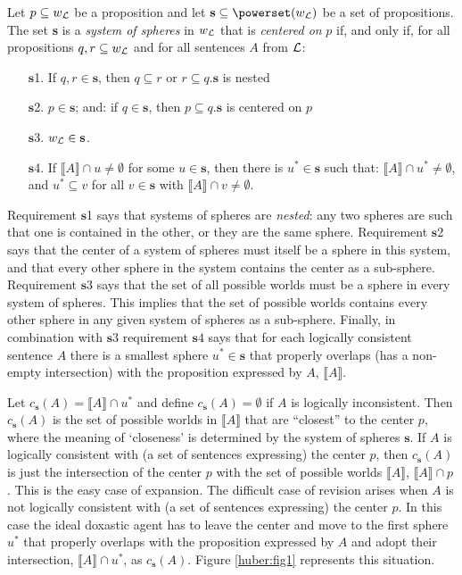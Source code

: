 Let $p\subseteq w_{\cal L}$ be a proposition and let $\textbf{s}\subseteq\powerset\!\left(w_{\cal L}\right)$ be a set of propositions. The set \textbf{s} is a \emph{system of spheres} in $w_{\cal L}$ that is \emph{centered on} $p$ if, and only if, for all propositions $q,r\subseteq w_{\cal L}$ and for all sentences $A$ from $\cal L$:
\begin{enumerate}
\item[$\textbf{s}$1.] If $q,r\in\textbf{s}$, then $q\subseteq r$ or $r\subseteq q$.\hfill $\textbf{s}$ is nested
\item[$\textbf{s}$2.] $p\in\textbf{s}$; and: if $q\in\textbf{s}$, then $p\subseteq q$.\hfill $\textbf{s}$ is centered on $p$
\item[$\textbf{s}$3.] $w_{\cal L}\in\textbf{s}$.
\item[$\textbf{s}$4.] If $\llbracket A\rrbracket\cap u\neq\emptyset$ for some $u\in\textbf{s}$, then there is $u^*\in\textbf{s}$ such that: $\llbracket A\rrbracket\cap u^*\neq\emptyset$, and $u^*\subseteq v$ for all $v\in\textbf{s}$ with $\llbracket A\rrbracket\cap v\neq\emptyset$.
\end{enumerate}
Requirement $\textbf{s}$1 says that systems of spheres are \emph{nested}: any two spheres are such that one is contained in the other, or they are the same sphere. Requirement $\textbf{s}$2
says that the center of a system of spheres must itself be a sphere in this system, and that every other sphere in the system contains the center as a sub-sphere. Requirement $\textbf{s}$3 says that the set of all possible worlds must be a sphere in every system of spheres. This implies that the set of possible worlds contains every other sphere in any given system of spheres as a sub-sphere. Finally, in combination with $\textbf{s}3$ requirement $\textbf{s}4$ says that for each logically consistent sentence $A$ there is a smallest sphere $u^*\in\textbf{s}$ that properly overlaps (has a non-empty intersection) with the proposition expressed by $A$, $\llbracket A\rrbracket$.

Let $c_{\textbf{s}}\left(A\right)=\llbracket A\rrbracket\cap u^*$ and define $c_{\textbf{s}}\left(A\right)=\emptyset$ if $A$ is logically inconsistent. Then $c_{\textbf{s}}\left(A\right)$ is the set of possible worlds in $\llbracket A\rrbracket$ that are ``closest'' to the center $p$, where the meaning of `closeness' is determined by the system of spheres $\textbf{s}$. If $A$ is logically consistent with (a set of sentences expressing) the center $p$, then $c_{\textbf{s}}\left(A\right)$ is just the intersection of the center $p$ with the set of possible worlds $\llbracket A\rrbracket$, $\llbracket A\rrbracket\cap p$. This is the easy case of expansion. The difficult case of revision arises when $A$ is not logically consistent with (a set of sentences expressing) the center $p$. In this case the ideal doxastic agent has to leave the center and move to the first sphere $u^*$ that properly overlaps with the proposition expressed by $A$ and adopt their intersection, $\llbracket A\rrbracket\cap u^*$, as $c_{\textbf{s}}\left(A\right)$. Figure \ref{huber:fig1} represents this situation.

